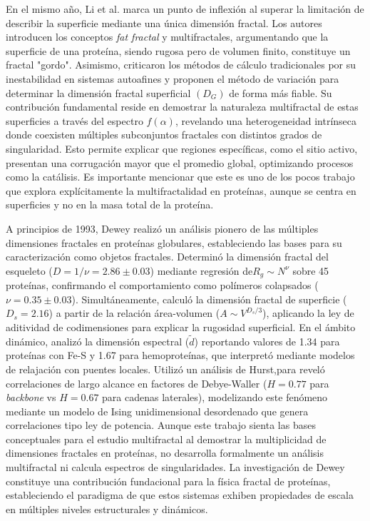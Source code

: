 En el mismo año, Li et al. \cite{HouqiangLi1991} marca un punto de inflexi\'{o}n al superar la limitaci\'{o}n de describir la superficie mediante una \'{u}nica dimensi\'{o}n fractal. Los autores introducen los conceptos \textit{fat fractal} y multifractales, argumentando que la superficie de una prote\'{i}na, siendo rugosa pero de volumen finito, constituye un fractal "gordo". Asimismo, criticaron los m\'{e}todos de c\'{a}lculo tradicionales por su inestabilidad en sistemas autoafines y proponen el m\'{e}todo de variaci\'{o}n para determinar la dimensi\'{o}n fractal superficial $(D_G)$ de forma m\'{a}s fiable. Su contribuci\'{o}n fundamental reside en demostrar la naturaleza multifractal de estas superficies a trav\'{e}s del espectro $f(\alpha)$, revelando una heterogeneidad intr\'{i}nseca donde coexisten m\'{u}ltiples subconjuntos fractales con distintos grados de singularidad. Esto permite explicar que regiones espec\'{i}ficas, como el sitio activo, presentan una corrugaci\'{o}n mayor que el promedio global, optimizando procesos como la cat\'{a}lisis. Es importante mencionar que este es uno de los pocos trabajo que explora explícitamente la multifractalidad en proteínas, aunque se centra en superficies y no en la masa total de la proteína.


A principios de 1993, Dewey \cite{Dewey1993} realizó un análisis pionero de las múltiples dimensiones fractales en proteínas globulares, estableciendo las bases para su caracterización como objetos fractales. Determinó la dimensión fractal del esqueleto ($D = 1/\nu = 2.86 \pm 0.03$) mediante regresión de$R_g \sim N^\nu$ sobre 45 proteínas, confirmando el comportamiento como polímeros colapsados ($\nu = 0.35 \pm 0.03$). Simultáneamente, calculó la dimensión fractal de superficie ($D_s = 2.16$) a partir de la relación área-volumen ($A \sim V^{D_s/3}$), aplicando la ley de aditividad de codimensiones para explicar la rugosidad superficial. En el ámbito dinámico, analizó la dimensión espectral ($\tilde{d}$) reportando valores de 1.34 para proteínas con Fe-S y 1.67 para hemoproteínas, que interpretó mediante modelos de relajación con puentes locales. Utilizó un análisis de Hurst,para reveló correlaciones de largo alcance en factores de Debye-Waller ($H = 0.77$ para \textit{backbone} vs $H = 0.67$ para cadenas laterales), modelizando este fenómeno mediante un modelo de Ising unidimensional desordenado que genera correlaciones tipo ley de potencia. Aunque este trabajo sienta las bases conceptuales para el estudio multifractal al demostrar la multiplicidad de dimensiones fractales en proteínas, no desarrolla formalmente un análisis multifractal ni calcula espectros de singularidades. La investigación de Dewey constituye una contribución fundacional para la física fractal de proteínas, estableciendo el paradigma de que estos sistemas exhiben propiedades de escala en múltiples niveles estructurales y dinámicos.


